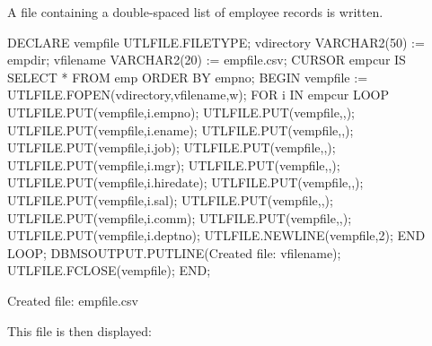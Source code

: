 \documentclass[letterpaper,10pt,english,openany,oneside]{sphinxmanual}
\begin{document}

A file containing a double-spaced list of employee records is written.

%
\begin{sphinxVerbatim}[commandchars=\\\{\}]
DECLARE
    v\PYGZus{}empfile       UTL\PYGZus{}FILE.FILE\PYGZus{}TYPE;
    v\PYGZus{}directory     VARCHAR2(50) := \PYGZsq{}empdir\PYGZsq{};
    v\PYGZus{}filename      VARCHAR2(20) := \PYGZsq{}empfile.csv\PYGZsq{};
    CURSOR emp\PYGZus{}cur IS SELECT * FROM emp ORDER BY empno;
BEGIN
    v\PYGZus{}empfile := UTL\PYGZus{}FILE.FOPEN(v\PYGZus{}directory,v\PYGZus{}filename,\PYGZsq{}w\PYGZsq{});
    FOR i IN emp\PYGZus{}cur LOOP
        UTL\PYGZus{}FILE.PUT(v\PYGZus{}empfile,i.empno);
        UTL\PYGZus{}FILE.PUT(v\PYGZus{}empfile,\PYGZsq{},\PYGZsq{});
        UTL\PYGZus{}FILE.PUT(v\PYGZus{}empfile,i.ename);
        UTL\PYGZus{}FILE.PUT(v\PYGZus{}empfile,\PYGZsq{},\PYGZsq{});
        UTL\PYGZus{}FILE.PUT(v\PYGZus{}empfile,i.job);
        UTL\PYGZus{}FILE.PUT(v\PYGZus{}empfile,\PYGZsq{},\PYGZsq{});
        UTL\PYGZus{}FILE.PUT(v\PYGZus{}empfile,i.mgr);
        UTL\PYGZus{}FILE.PUT(v\PYGZus{}empfile,\PYGZsq{},\PYGZsq{});
        UTL\PYGZus{}FILE.PUT(v\PYGZus{}empfile,i.hiredate);
        UTL\PYGZus{}FILE.PUT(v\PYGZus{}empfile,\PYGZsq{},\PYGZsq{});
        UTL\PYGZus{}FILE.PUT(v\PYGZus{}empfile,i.sal);
        UTL\PYGZus{}FILE.PUT(v\PYGZus{}empfile,\PYGZsq{},\PYGZsq{});
        UTL\PYGZus{}FILE.PUT(v\PYGZus{}empfile,i.comm);
        UTL\PYGZus{}FILE.PUT(v\PYGZus{}empfile,\PYGZsq{},\PYGZsq{});
        UTL\PYGZus{}FILE.PUT(v\PYGZus{}empfile,i.deptno);
        UTL\PYGZus{}FILE.NEW\PYGZus{}LINE(v\PYGZus{}empfile,2);
    END LOOP;
    DBMS\PYGZus{}OUTPUT.PUT\PYGZus{}LINE(\PYGZsq{}Created file: \PYGZsq{} \textbar{}\textbar{} v\PYGZus{}filename);
    UTL\PYGZus{}FILE.FCLOSE(v\PYGZus{}empfile);
END;

Created file: empfile.csv
\end{sphinxVerbatim}

This file is then displayed:
\end{document}
